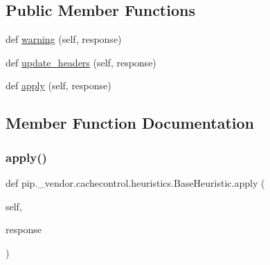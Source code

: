 \subsection*{Public Member Functions}
\begin{DoxyCompactItemize}
\item 
def \hyperlink{classpip_1_1__vendor_1_1cachecontrol_1_1heuristics_1_1BaseHeuristic_a60981da360ad1a5e7d01adc126f52b58}{warning} (self, response)
\item 
def \hyperlink{classpip_1_1__vendor_1_1cachecontrol_1_1heuristics_1_1BaseHeuristic_a497b372f9450576afb8ebfcdbb9a8930}{update\+\_\+headers} (self, response)
\item 
def \hyperlink{classpip_1_1__vendor_1_1cachecontrol_1_1heuristics_1_1BaseHeuristic_a71faff258b36ba951716a724386d4d06}{apply} (self, response)
\end{DoxyCompactItemize}


\subsection{Member Function Documentation}
\mbox{\label{classpip_1_1__vendor_1_1cachecontrol_1_1heuristics_1_1BaseHeuristic_a71faff258b36ba951716a724386d4d06}} 
\subsubsection{\texorpdfstring{apply()}{apply()}}
{\footnotesize\ttfamily def pip.\+\_\+vendor.\+cachecontrol.\+heuristics.\+Base\+Heuristic.\+apply (\begin{DoxyParamCaption}\item[{}]{self,  }\item[{}]{response }\end{DoxyParamCaption})}

\mbox{\label{classpip_1_1__vendor_1_1cachecontrol_1_1heuristics_1_1BaseHeuristic_a497b372f9450576afb8ebfcdbb9a8930}} 
